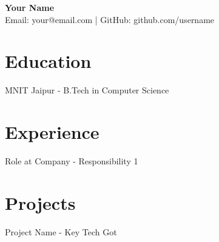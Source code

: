 \documentclass[a4paper,10pt]{article}
\begin{document}
\begin{center}

    {\huge \bf Your Name} \\

    Email: your@email.com | GitHub: github.com/username

\end{center}

\section*{Education}

MNIT Jaipur - B.Tech in Computer Science

\section*{Experience}

Role at Company - Responsibility 1

\section*{Projects}

Project Name - Key Tech Got
\end{document}
